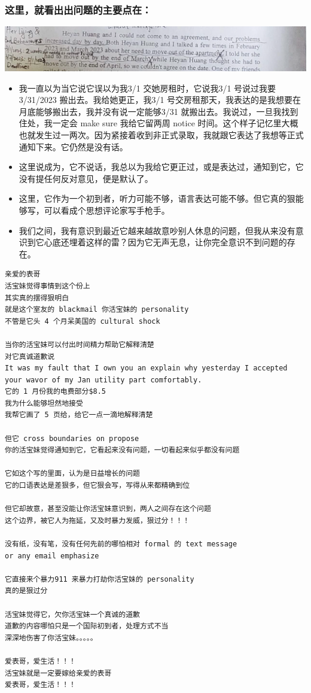 \documentclass[9pt, b5paper]{article}
\begin{document}
\subsubsection{这里，就看出出问题的主要点在：}
\label{sec-7-3-1}

\includegraphics[width=.9\linewidth]{./pic/readme2_20230330_164636.png}
\begin{itemize}
\item 我一直以为当它说它误以为我3/1 交她房租时，它说我3/1 号说过我要 3/31/2023 搬出去。我给她更正，我3/1 号交房租那天，我表达的是我想要在月底能够搬出去，我并没有说一定能够3/31 就搬出去。我说过，一旦我找到住处，我一定会 make sure 我给它留两周 notice 时间。这个样子记忆里大概也就发生过一两次。因为紧接着收到非正式录取，我就跟它表达了我想等正式通知下来。它仍然是没有话。
\item 这里说成为，它不说话，我总以为我给它更正过，或是表达过，通知到它，它没有提任何反对意见，便是默认了。
\item 这里，它作为一个初到者，听力可能不够，语言表达可能不够。但它真的狠能够写，可以看成个思想评论家写手枪手。
\item 我们之间，我有意识到最近它越来越故意吵别人休息的问题，但我从来没有意识到它心底还埋着这样的雷？因为它无声无息，让你完全意识不到问题的存在。
\end{itemize}
\begin{verbatim}
亲爱的表哥
活宝妹觉得事情到这个份上
其实真的摆得狠明白
就是这个室友的 blackmail 你活宝妹的 personality
不管是它头 4 个月呆美国的 cultural shock

当你的活宝妹可以付出时间精力帮助它解释清楚
对它真诚道歉说
It was my fault that I own you an explain why yesterday I accepted your wavor of my Jan utility part comfortably.
它的 1 月份我的电费部分$8.5
我为什么能够坦然地接受
我帮它画了 5 页给，给它一点一滴地解释清楚

但它 cross boundaries on propose
你的活宝妹觉得通知到它，它看起来没有问题，一切看起来似乎都没有问题

它如这个写的里面，认为是日益增长的问题
它的口语表达是差狠多，但它狠会写，写得从来都精确到位

但它却故意，甚至没能让你活宝妹意识到，两人之间存在这个问题
这个边界，被它人为拖延，又及时暴力发威，狠过分！！！

没有纸，没有笔，没有任何先前的哪怕相对 formal 的 text message
or any email emphasize

它直接来个暴力911 来暴力打劫你活宝妹的 personality
真的是狠过分

活宝妹觉得它，欠你活宝妹一个真诚的道歉
道歉的内容哪怕只是一个国际初到者，处理方式不当
深深地伤害了你活宝妹。。。。。

爱表哥，爱生活！！！
活宝妹就是一定要嫁给亲爱的表哥
爱表哥，爱生活！！！
\end{verbatim}
\end{document}
